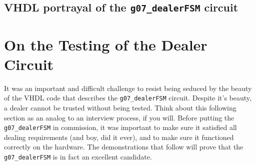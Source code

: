 \documentclass[12pt]{report}
\begin{document}
\section*{VHDL portrayal of the \texttt{g07\_dealerFSM} circuit}
\label{s:vhdl}


\chapter*{On the Testing of the Dealer Circuit}
It was an important and difficult challenge to resist being seduced by the beauty of the VHDL code
that describes the \texttt{g07\_dealerFSM} circuit. Despite it's beauty, a dealer cannot be trusted
without being tested. Think about this following section as an analog to an interview process, if
you will. Before putting the \texttt{g07\_dealerFSM} in commission, it was important to make sure it
satisfied all dealing requirements (and boy, did it ever), and to make sure it functioned correctly
on the hardware. The demonstrations that follow will prove that the \texttt{g07\_dealerFSM} is in
fact an excellent candidate.
\end{document}
